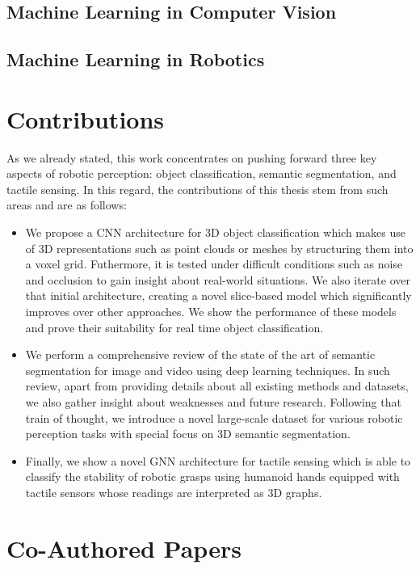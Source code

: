 \subsection{Machine Learning in Computer Vision}

\subsection{Machine Learning in Robotics}

\section{Contributions}
\label{cha:introduction:sec:contributions}

As we already stated, this work concentrates on pushing forward three key aspects of robotic perception: object classification, semantic segmentation, and tactile sensing. In this regard, the contributions of this thesis stem from such areas and are as follows:

\begin{itemize}
    \item We propose a \acl{CNN} architecture for \acs{3D} object classification which makes use of \acs{3D} representations such as point clouds or meshes by structuring them into a voxel grid. Futhermore, it is tested under difficult conditions such as noise and occlusion to gain insight about real-world situations. We also iterate over that initial architecture, creating a novel slice-based model which significantly improves over other approaches. We show the performance of these models and prove their suitability for real time object classification.
    \item We perform a comprehensive review of the state of the art of semantic segmentation for image and video using deep learning techniques. In such review, apart from providing details about all existing methods and datasets, we also gather insight about weaknesses and future research. Following that train of thought, we introduce a novel large-scale dataset for various robotic perception tasks with special focus on 3D semantic segmentation.
    \item Finally, we show a novel \acl{GNN} architecture for tactile sensing which is able to classify the stability of robotic grasps using humanoid hands equipped with tactile sensors whose readings are interpreted as \acs{3D} graphs.
\end{itemize}

\section{Co-Authored Papers}
\label{cha:introduction:sec:papers}

